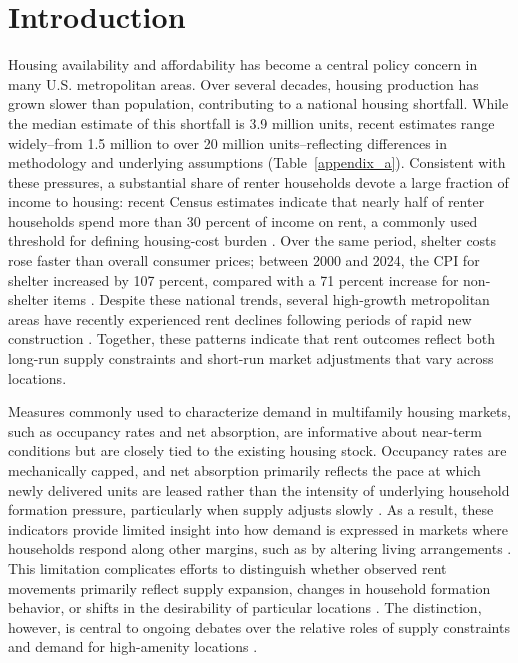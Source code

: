 \documentclass[pdflatex,sn-basic]{sn-jnl}%
\theoremstyle{thmstyleone}%
\theoremstyle{thmstyletwo}%
\theoremstyle{thmstylethree}%
\begin{document}


\maketitle


\section{Introduction}\label{sec1}
Housing availability and affordability has become a central policy concern in many U.S. metropolitan areas. Over several decades, housing production has grown slower than population, contributing to a national housing shortfall. While the median estimate of this shortfall is 3.9 million units, recent estimates range widely--from 1.5 million to over 20 million units--reflecting differences in methodology and underlying assumptions (Table~\ref{appendix_a}). Consistent with these pressures, a substantial share of renter households devote a large fraction of income to housing: recent Census estimates indicate that nearly half of renter households spend more than 30 percent of income on rent, a commonly used threshold for defining housing-cost burden \cite{censusNearlyHalf}. Over the same period, shelter costs rose faster than overall consumer prices; between 2000 and 2024, the CPI for shelter increased by 107 percent, compared with a 71 percent increase for non-shelter items \cite{stlouisfedConsumerPrice}. Despite these national trends, several high-growth metropolitan areas have recently experienced rent declines following periods of rapid new construction \cite{mott2024ThisRegion}. Together, these patterns indicate that rent outcomes reflect both long-run supply constraints and short-run market adjustments that vary across locations.

Measures commonly used to characterize demand in multifamily housing markets, such as occupancy rates and net absorption, are informative about near-term conditions but are closely tied to the existing housing stock. Occupancy rates are mechanically capped, and net absorption primarily reflects the pace at which newly delivered units are leased rather than the intensity of underlying household formation pressure, particularly when supply adjusts slowly \cite{mueller1999real}. As a result, these indicators provide limited insight into how demand is expressed in markets where households respond along other margins, such as by altering living arrangements \cite{gabriel2001rental, sirmans1991determinants, pyhrr1999real}. This limitation complicates efforts to distinguish whether observed rent movements primarily reflect supply expansion, changes in household formation behavior, or shifts in the desirability of particular locations \cite{pennington2021does, molloy2022housing}. The distinction, however, is central to ongoing debates over the relative roles of supply constraints \cite{saiz2010geographic} and demand for high-amenity locations \cite{davidoff2015supply}.
\end{document}
